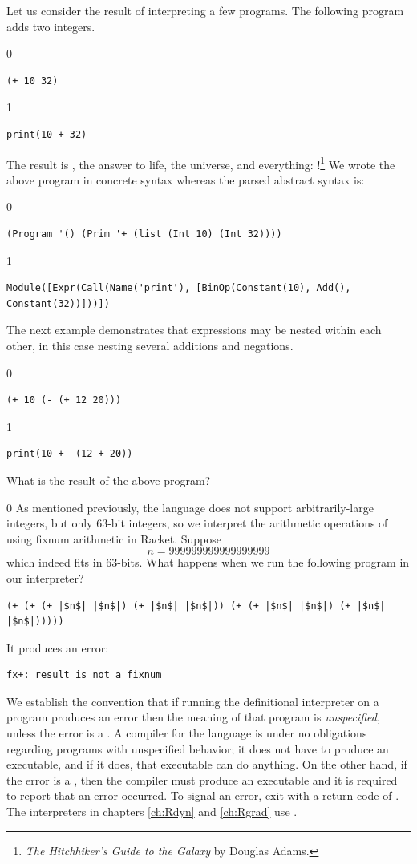 \documentclass[7x10]{TimesAPriori_MIT}%
\def\racketEd{0}
\def\pythonEd{1}
\def\edition{1}
\begin{document}
Let us consider the result of interpreting a few \LangInt{} programs. The
following program adds two integers.
{\if\edition\racketEd
\begin{lstlisting}
(+ 10 32)
\end{lstlisting}
\fi}
{\if\edition\pythonEd
\begin{lstlisting}
print(10 + 32)
\end{lstlisting}
\fi}
The result is , the answer to life, the universe, and
everything: !\footnote{\emph{The Hitchhiker's Guide to the
    Galaxy} by Douglas Adams.}
%
We wrote the above program in concrete syntax whereas the parsed
abstract syntax is:
{\if\edition\racketEd
\begin{lstlisting}
(Program '() (Prim '+ (list (Int 10) (Int 32))))
\end{lstlisting}
\fi}
{\if\edition\pythonEd
\begin{lstlisting}
Module([Expr(Call(Name('print'), [BinOp(Constant(10), Add(), Constant(32))]))])    
\end{lstlisting}
\fi}
The next example demonstrates that expressions may be nested within
each other, in this case nesting several additions and negations.
{\if\edition\racketEd
\begin{lstlisting}
(+ 10 (- (+ 12 20)))
\end{lstlisting}
\fi}
{\if\edition\pythonEd
\begin{lstlisting}
print(10 + -(12 + 20))
\end{lstlisting}
\fi}
%
\noindent What is the result of the above program?

{\if\edition\racketEd
As mentioned previously, the \LangInt{} language does not support
arbitrarily-large integers, but only $63$-bit integers, so we
interpret the arithmetic operations of \LangInt{} using fixnum arithmetic
in Racket.
Suppose
\[
  n = 999999999999999999
\]
which indeed fits in $63$-bits.  What happens when we run the
following program in our interpreter?
\begin{lstlisting}
(+ (+ (+ |$n$| |$n$|) (+ |$n$| |$n$|)) (+ (+ |$n$| |$n$|) (+ |$n$| |$n$|)))))
\end{lstlisting}
It produces an error:
\begin{lstlisting}
fx+: result is not a fixnum
\end{lstlisting}
We establish the convention that if running the definitional
interpreter on a program produces an error then the meaning of that
program is \emph{unspecified}, unless the
error is a . A compiler for the language is under
no obligations regarding programs with unspecified behavior; it does
not have to produce an executable, and if it does, that executable can
do anything.  On the other hand, if the error is a
, then the compiler must produce an executable and
it is required to report that an error occurred. To signal an error,
exit with a return code of .  The interpreters in chapters
\ref{ch:Rdyn} and \ref{ch:Rgrad} use
.
\fi}
\end{document}
